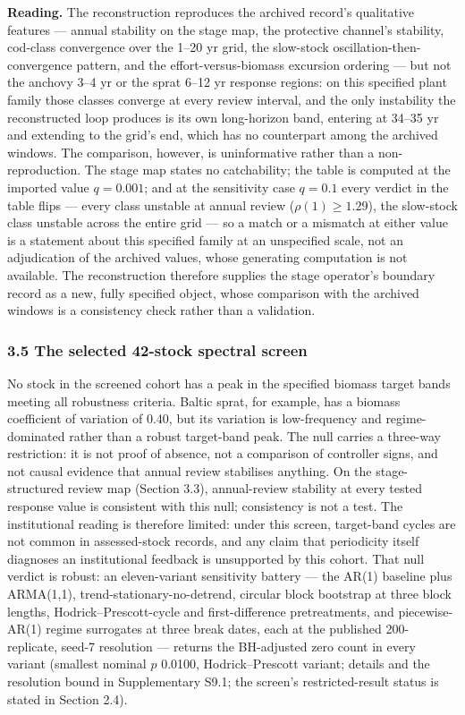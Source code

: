\documentclass[11pt]{article}
\begin{document}
\textbf{Reading.} The reconstruction reproduces the archived record's
qualitative features --- annual stability on the stage map, the
protective channel's stability, cod-class convergence over the 1--20 yr
grid, the slow-stock oscillation-then-convergence pattern, and the
effort-versus-biomass excursion ordering --- but not the anchovy 3--4 yr
or the sprat 6--12 yr response regions: on this specified plant family
those classes converge at every review interval, and the only
instability the reconstructed loop produces is its own long-horizon
band, entering at 34--35 yr and extending to the grid's end, which has
no counterpart among the archived windows. The comparison, however, is
uninformative rather than a non-reproduction. The stage map states no
catchability; the table is computed at the imported value \(q = 0.001\);
and at the sensitivity case \(q = 0.1\) every verdict in the table
flips --- every class unstable at annual review (\(\rho(1) \ge 1.29\)),
the slow-stock class unstable across the entire grid --- so a match or a
mismatch at either value is a statement about this specified family at an
unspecified scale, not an adjudication of the archived values, whose
generating computation is not available. The reconstruction therefore
supplies the stage operator's boundary record as a new, fully specified
object, whose comparison with the archived windows is a consistency
check rather than a validation.

\subsubsection{3.5 The selected 42-stock spectral
screen}\label{the-selected-42-stock-spectral-screen}

No stock in the screened cohort has a peak in the specified biomass target
bands meeting all robustness criteria. Baltic sprat, for example,
has a biomass coefficient of variation of 0.40, but its variation is
low-frequency and regime-dominated rather than a robust target-band
peak. The null carries a three-way restriction: it is not
proof of absence, not a comparison of controller signs, and not causal
evidence that annual review stabilises anything. On the stage-structured
review map (Section 3.3), annual-review stability at every tested response value is
consistent with this null; consistency is not a test. The institutional
reading is therefore limited: under this screen, target-band
cycles are not common in assessed-stock records, and any claim that
periodicity itself diagnoses an institutional feedback is unsupported by
this cohort. That null verdict is robust: an eleven-variant sensitivity
battery --- the AR(1) baseline plus ARMA(1,1), trend-stationary-no-detrend, circular block
bootstrap at three block lengths, Hodrick--Prescott-cycle and
first-difference pretreatments, and piecewise-AR(1) regime surrogates at
three break dates, each at the published 200-replicate, seed-7
resolution --- returns the BH-adjusted zero count in every variant
(smallest nominal \(p\) 0.0100, Hodrick--Prescott variant; details and
the resolution bound in Supplementary S9.1; the screen's restricted-result status is stated in Section 2.4).
\end{document}
